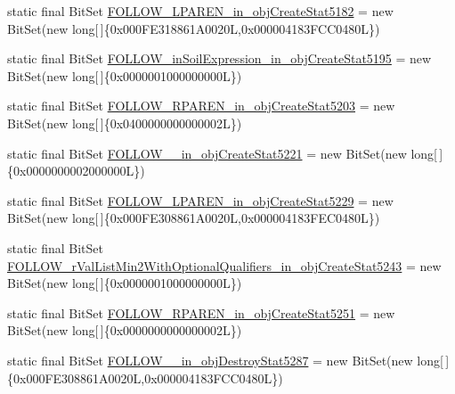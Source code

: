\begin{DoxyCompactItemize}
\item 
static final Bit\-Set \hyperlink{classorg_1_1tzi_1_1use_1_1parser_1_1testsuite_1_1_test_suite_parser_a502763c5bfd178bc626ac34d76f392a5}{F\-O\-L\-L\-O\-W\-\_\-\-L\-P\-A\-R\-E\-N\-\_\-in\-\_\-obj\-Create\-Stat5182} = new Bit\-Set(new long\mbox{[}$\,$\mbox{]}\{0x000\-F\-E318861\-A0020\-L,0x000004183\-F\-C\-C0480\-L\})
\item 
static final Bit\-Set \hyperlink{classorg_1_1tzi_1_1use_1_1parser_1_1testsuite_1_1_test_suite_parser_a3e39e275cc75f118fcc7a4a5ad0288a9}{F\-O\-L\-L\-O\-W\-\_\-in\-Soil\-Expression\-\_\-in\-\_\-obj\-Create\-Stat5195} = new Bit\-Set(new long\mbox{[}$\,$\mbox{]}\{0x0000001000000000\-L\})
\item 
static final Bit\-Set \hyperlink{classorg_1_1tzi_1_1use_1_1parser_1_1testsuite_1_1_test_suite_parser_a8bad3b515288e0888a66249c84d4445f}{F\-O\-L\-L\-O\-W\-\_\-\-R\-P\-A\-R\-E\-N\-\_\-in\-\_\-obj\-Create\-Stat5203} = new Bit\-Set(new long\mbox{[}$\,$\mbox{]}\{0x0400000000000002\-L\})
\item 
static final Bit\-Set \hyperlink{classorg_1_1tzi_1_1use_1_1parser_1_1testsuite_1_1_test_suite_parser_a36f7bdb95bd43f35ae295e42db748b45}{F\-O\-L\-L\-O\-W\-\_\-\_\-in\-\_\-obj\-Create\-Stat5221} = new Bit\-Set(new long\mbox{[}$\,$\mbox{]}\{0x0000000002000000\-L\})
\item 
static final Bit\-Set \hyperlink{classorg_1_1tzi_1_1use_1_1parser_1_1testsuite_1_1_test_suite_parser_a9434ce342ba9dba04de6313ed42d4932}{F\-O\-L\-L\-O\-W\-\_\-\-L\-P\-A\-R\-E\-N\-\_\-in\-\_\-obj\-Create\-Stat5229} = new Bit\-Set(new long\mbox{[}$\,$\mbox{]}\{0x000\-F\-E308861\-A0020\-L,0x000004183\-F\-E\-C0480\-L\})
\item 
static final Bit\-Set \hyperlink{classorg_1_1tzi_1_1use_1_1parser_1_1testsuite_1_1_test_suite_parser_ad91c75477d874285a765241e24d02479}{F\-O\-L\-L\-O\-W\-\_\-r\-Val\-List\-Min2\-With\-Optional\-Qualifiers\-\_\-in\-\_\-obj\-Create\-Stat5243} = new Bit\-Set(new long\mbox{[}$\,$\mbox{]}\{0x0000001000000000\-L\})
\item 
static final Bit\-Set \hyperlink{classorg_1_1tzi_1_1use_1_1parser_1_1testsuite_1_1_test_suite_parser_ae2facd13cef0dc0853eb26e365468a35}{F\-O\-L\-L\-O\-W\-\_\-\-R\-P\-A\-R\-E\-N\-\_\-in\-\_\-obj\-Create\-Stat5251} = new Bit\-Set(new long\mbox{[}$\,$\mbox{]}\{0x0000000000000002\-L\})
\item 
static final Bit\-Set \hyperlink{classorg_1_1tzi_1_1use_1_1parser_1_1testsuite_1_1_test_suite_parser_ab6cc90d6bc56125ea626dd93c76030eb}{F\-O\-L\-L\-O\-W\-\_\-\_\-in\-\_\-obj\-Destroy\-Stat5287} = new Bit\-Set(new long\mbox{[}$\,$\mbox{]}\{0x000\-F\-E308861\-A0020\-L,0x000004183\-F\-C\-C0480\-L\})

\end{DoxyCompactItemize}
